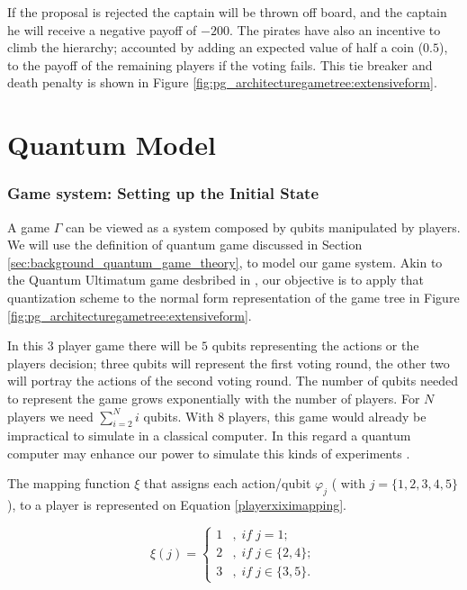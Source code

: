 \documentclass[10pt,twocolumn]{llncs}
\begin{document}
If the proposal is rejected the captain will be thrown off board, and the captain he will receive a negative payoff of $-200$. The pirates have also an incentive to climb the hierarchy; accounted by adding an expected value of half a coin ($0.5$), to the payoff of the remaining players if the voting fails. This tie breaker and death penalty is shown in Figure \ref{fig:pg_architecturegametree:extensiveform}.

\section{Quantum Model}
\subsubsection{Game system: Setting up the Initial State}
\label{subsec:pirates_initialstate}

A game $\Gamma$ can be viewed as a system composed by qubits manipulated by players. We will use the definition of quantum game discussed in Section \ref{sec:background_quantum_game_theory}, to model our game system. Akin to the Quantum Ultimatum game desbribed in \cite{Fra2011}, our objective is to apply that quantization scheme to the normal form representation of the game tree in Figure \ref{fig:pg_architecturegametree:extensiveform}.


In this $3$ player game there will be $5$ qubits representing the actions or the players decision; three qubits will represent the first voting round, the other two will portray the actions of the second voting round.
The number of qubits needed to represent the game grows exponentially with the number of players. For $N$ players we need $\sum_{i=2}^{N}{i}$ qubits. With 8 players, this game would already be impractical to simulate in a classical computer. In this regard a quantum computer may enhance our power to simulate this kinds of experiments \cite{Rieffel2011}.

The mapping function $\xi$ that assigns each action/qubit $\varphi_{j}$ ( with $j=\{ 1, 2, 3, 4, 5\}$), to a player is represented on Equation \ref{playerxiximapping}. 

\begin{equation}
\xi(j)=\begin{cases}
1 & ,\; if\; j=1;\\
2 & ,\; if\; j\in\{2,4\};\\
3 & ,\; if\; j\in\{3,5\}.
\end{cases}
\label{playerxiximapping}
\end{equation}
\end{document}
